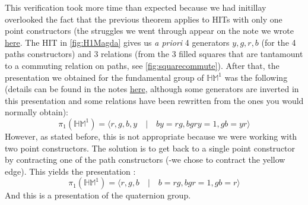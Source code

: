\documentclass{report}
\begin{document}
This verification took more time than expected because we had initillay overlooked the fact that the previous theorem applies to HITs with only one point constructors (the struggles we went through appear on the note we wrote \href{https://github.com/dlaird-ens/Stage-L3/blob/main/Rapport/annexes/hypercubic.pdf}{here}. The HIT in \ref{fig:H1Magda} gives us \textit{a priori} 4 generators $y,g,r,b$ (for the 4 paths constructors) and 3 relations (from the 3 filled squares that are tantamount to a commuting relation on paths, see \ref{fig:squarecommute}). After that, the presentation we obtained for the fundamental group of $\mathbb{HM}^1$ was the following (details can be found in the notes \href{https://github.com/dlaird-ens/Stage-L3/blob/main/Rapport/annexes/hypercubic.pdf}{here}, although some generators are inverted in this presentation and some relations have been rewritten from the ones you would normally obtain):
$$ \pi_1(\mathbb{HM}^1) = \langle r,g,b,y \quad \vert \quad by=rg, bgry=1, gb = yr \rangle$$
However, as stated before, this is not appropriate because we were working with two point constructors. The solution is to get back to a single point constructor by contracting one of the path constructors (-we chose to contract the yellow edge). This yields the presentation : 
$$ \pi_1(\mathbb{HM}^1) = \langle r,g,b \quad \vert \quad b=rg, bgr=1, gb = r \rangle$$
And this is a presentation of the quaternion group.
\end{document}
